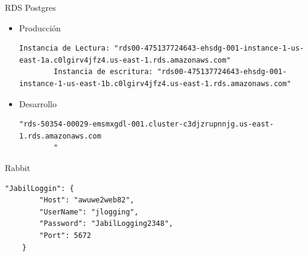 \documentclass[a4paper, 10pt]{article}
\begin{document}
RDS Postgres
\begin{itemize}
	\item Producción
	\begin{lstlisting}[language={[Sharp]C}]
		Instancia de Lectura: "rds00-475137724643-ehsdg-001-instance-1-us-east-1a.c0lgirv4jfz4.us-east-1.rds.amazonaws.com"
		Instancia de escritura: "rds00-475137724643-ehsdg-001-instance-1-us-east-1b.c0lgirv4jfz4.us-east-1.rds.amazonaws.com"
	\end{lstlisting}
	
	\item Desarrollo
	\begin{lstlisting}[language={[Sharp]C}]
		"rds-50354-00029-emsmxgdl-001.cluster-c3djzrupnnjg.us-east-1.rds.amazonaws.com
		"
	\end{lstlisting}

\end{itemize}

 Rabbit
\begin{lstlisting}[language={[Sharp]C}]
	"JabilLoggin": {
		"Host": "awuwe2web82",
		"UserName": "jlogging",
		"Password": "JabilLogging2348",
		"Port": 5672
	}
\end{lstlisting}
\end{document}
